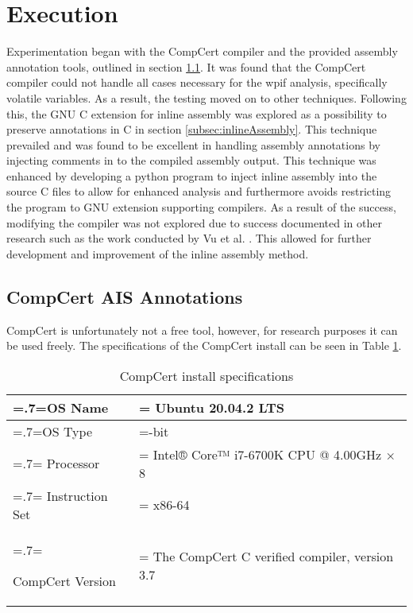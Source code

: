 \section{Execution}
Experimentation began with the CompCert compiler and the provided assembly annotation tools, outlined in section \ref{subsec:compCert}. It was found that the CompCert compiler could not handle all cases necessary for the wpif analysis, specifically volatile variables. As a result, the testing moved on to other techniques. Following this, the GNU C extension for inline assembly was explored as a possibility to preserve annotations in C in section \ref{subsec:inlineAssembly}. This technique prevailed and was found to be excellent in handling assembly annotations by injecting comments in to the compiled assembly output. This technique was enhanced by developing a python program to inject inline assembly into the source C files to allow for enhanced analysis and furthermore avoids restricting the program to GNU extension supporting compilers. As a result of the success, modifying the compiler was not explored due to success documented in other research such as the work conducted by Vu et al. \cite{vu2020secure}. This allowed for further development and improvement of the inline assembly method.

\subsection{CompCert AIS Annotations}
\label{subsec:compCert}
CompCert is unfortunately not a free tool, however, for research purposes it can be used freely. The specifications of the CompCert install can be seen in Table \ref{tab:compcertInstall}. 

\begin{table}
    \begin{center}
        \begin{tabularx}{\linewidth} { 
            | >{\hsize=.7\hsize\linewidth=\hsize}X 
            | >{\hsize=1.3\hsize\linewidth=\hsize}X  | }
            \hline
            OS Name & Ubuntu 20.04.2 LTS \\
            \hline
            OS Type & 64-bit \\
            \hline
            Processor & Intel® Core™ i7-6700K CPU @ 4.00GHz × 8 \\
            \hline
            Instruction Set & x86-64 \\
            \hline
            \raggedright
            CompCert Version & The CompCert C verified compiler, version 3.7 \\
            \hline
        \end{tabularx}
    \end{center}
    \caption{CompCert install specifications}
    \label{tab:compcertInstall}
\end{table}

